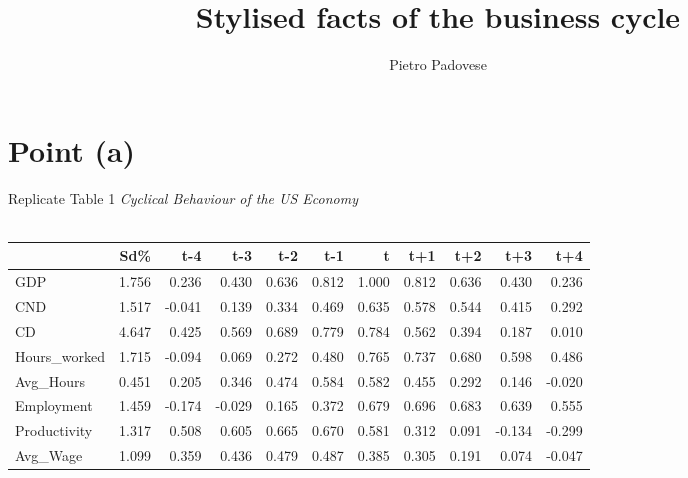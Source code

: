 \documentclass[12pt]{article}
\author{Pietro Padovese}
\title{Stylised facts of the business cycle}
\begin{document}
\maketitle

\section{Point (a)}
Replicate Table 1 \textit{Cyclical Behaviour of the US Economy}\\\\


\begin{table}[htbp]
\begin{adjustwidth}{-1cm}{}
\begin{center}
\begin{tabular}{lrrrrrrrrrr}
\toprule
{} &   Sd\% &    t-4 &    t-3 &   t-2 &   t-1 &     t &   t+1 &   t+2 &    t+3 &    t+4 \\
\midrule
GDP          & 1.756 &  0.236 &  0.430 & 0.636 & 0.812 & 1.000 & 0.812 & 0.636 &  0.430 &  0.236 \\
CND          & 1.517 & -0.041 &  0.139 & 0.334 & 0.469 & 0.635 & 0.578 & 0.544 &  0.415 &  0.292 \\
CD           & 4.647 &  0.425 &  0.569 & 0.689 & 0.779 & 0.784 & 0.562 & 0.394 &  0.187 &  0.010 \\
Hours\_worked & 1.715 & -0.094 &  0.069 & 0.272 & 0.480 & 0.765 & 0.737 & 0.680 &  0.598 &  0.486 \\
Avg\_Hours    & 0.451 &  0.205 &  0.346 & 0.474 & 0.584 & 0.582 & 0.455 & 0.292 &  0.146 & -0.020 \\
Employment   & 1.459 & -0.174 & -0.029 & 0.165 & 0.372 & 0.679 & 0.696 & 0.683 &  0.639 &  0.555 \\
Productivity & 1.317 &  0.508 &  0.605 & 0.665 & 0.670 & 0.581 & 0.312 & 0.091 & -0.134 & -0.299 \\
Avg\_Wage     & 1.099 &  0.359 &  0.436 & 0.479 & 0.487 & 0.385 & 0.305 & 0.191 &  0.074 & -0.047 \\
\bottomrule
\end{tabular}
\end{center}
\end{adjustwidth}
\end{table}
\end{document}
